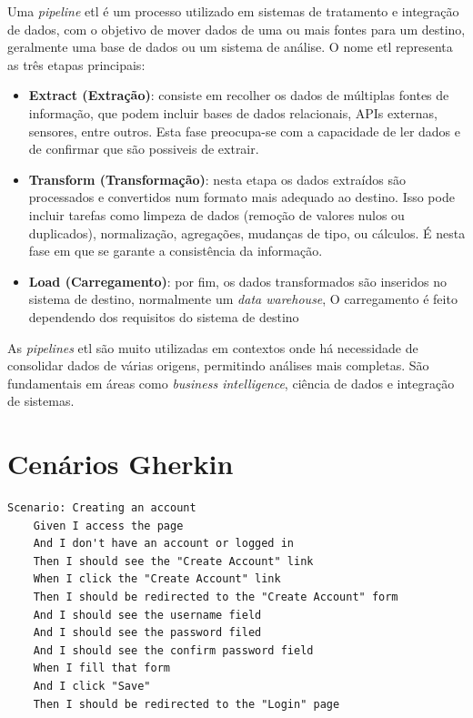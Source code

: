 Uma \textit{pipeline} \gls{etl} é um processo utilizado em sistemas de tratamento e integração de dados, com o objetivo de mover dados de uma ou mais fontes para um destino, geralmente uma base de dados ou um sistema de análise. O nome \gls{etl} representa as três etapas principais:

\begin{itemize}
  \item \textbf{Extract (Extração)}: consiste em recolher os dados de múltiplas fontes de informação, que podem incluir bases de dados relacionais, APIs externas, sensores, entre outros. Esta fase preocupa-se com a capacidade de ler dados e de confirmar que são possiveis de extrair.
  
  \item \textbf{Transform (Transformação)}: nesta etapa os dados extraídos são processados e convertidos num formato mais adequado ao destino. Isso pode incluir tarefas como limpeza de dados (remoção de valores nulos ou duplicados), normalização, agregações, mudanças de tipo, ou cálculos. É nesta fase em que se garante a consistência da informação.

  \item \textbf{Load (Carregamento)}: por fim, os dados transformados são inseridos no sistema de destino, normalmente um \textit{data warehouse},  O carregamento é feito dependendo dos requisitos do sistema de destino

\end{itemize}

As \textit{pipelines} \gls{etl} são muito utilizadas em contextos onde há necessidade de consolidar dados de várias origens, permitindo análises mais completas. São fundamentais em áreas como \textit{business intelligence}, ciência de dados e integração de sistemas.

\chapter{Cenários Gherkin}
\label{ch:cenariosGherkin}

\begin{verbatim}
Scenario: Creating an account
    Given I access the page 
    And I don't have an account or logged in
    Then I should see the "Create Account" link
    When I click the "Create Account" link
    Then I should be redirected to the "Create Account" form
    And I should see the username field
    And I should see the password filed
    And I should see the confirm password field
    When I fill that form
    And I click "Save"
    Then I should be redirected to the "Login" page
\end{verbatim}



